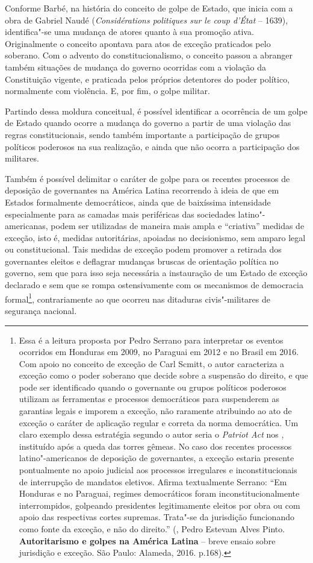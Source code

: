 Conforme Barbé, na história do conceito de golpe de Estado, que inicia
com a obra de Gabriel Naudé (\emph{Considérations politiques sur le coup
d'État} -- 1639), identifica"-se uma mudança de atores quanto à sua
promoção ativa. Originalmente o conceito apontava para atos de exceção
praticados pelo soberano. Com o advento do constitucionalismo, o
conceito passou a abranger também situações de mudança do governo
ocorridas com a violação da Constituição vigente, e praticada pelos
próprios detentores do poder político, normalmente com violência. E, por
fim, o golpe militar.

Partindo dessa moldura conceitual, é possível identificar a ocorrência
de um golpe de Estado quando ocorre a mudança do governo a partir de uma
violação das regras constitucionais, sendo também importante a
participação de grupos políticos poderosos na sua realização, e ainda
que não ocorra a participação dos militares.

Também é possível delimitar o caráter de golpe para os recentes
processos de deposição de governantes na América Latina recorrendo à
ideia de que em Estados formalmente democráticos, ainda que de
baixíssima intensidade especialmente para as camadas mais periféricas
das sociedades latino"-americanas, podem ser utilizadas de maneira mais
ampla e ``criativa'' medidas de exceção, isto é, medidas autoritárias,
apoiadas no decisionismo, sem amparo legal ou constitucional. Tais
medidas de exceção podem promover a retirada dos governantes eleitos e
deflagrar mudanças bruscas de orientação política no governo, sem que
para isso seja necessária a instauração de um Estado de exceção
declarado e sem que se rompa ostensivamente com os mecanismos de
democracia formal\footnote{Essa é a leitura proposta por Pedro Serrano
  para interpretar os eventos ocorridos em Honduras em 2009, no Paraguai
  em 2012 e no Brasil em 2016. Com apoio no conceito de exceção de Carl
  Scmitt, o autor caracteriza a exceção como o poder soberano que decide
  sobre a suspensão do direito, e que pode ser identificado quando o
  governante ou grupos políticos poderosos utilizam as ferramentas e
  processos democráticos para suspenderem as garantias legais e imporem
  a exceção, não raramente atribuindo ao ato de exceção o caráter de
  aplicação regular e correta da norma democrática. Um claro exemplo
  dessa estratégia segundo o autor seria o \emph{Patriot Act} nos ,
  instituído após a queda das torres gêmeas. No caso dos recentes
  processos latino"-americanos de deposição de governantes, a exceção
  estaria presente pontualmente no apoio judicial aos processos
  irregulares e inconstitucionais de interrupção de mandatos eletivos.
  Afirma textualmente Serrano: ``Em Honduras e no Paraguai, regimes
      democráticos foram inconstitucionalmente interrompidos, golpeando
      presidentes legitimamente eleitos por obra ou com apoio das
      respectivas cortes supremas. Trata"-se da jurisdição funcionando como
      fonte da exceção, e não do direito.'' (, Pedro Estevam Alves
  Pinto. \textbf{Autoritarismo e golpes na América Latina} -- breve
  ensaio sobre jurisdição e exceção. São Paulo: Alameda, 2016. p.168).},
contrariamente ao que ocorreu nas ditaduras civis"-militares de segurança
nacional.

